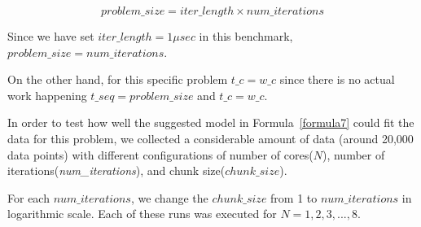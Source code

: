 \begin{equation}\label{problem_size}
problem\_size = iter\_length\times{num\_iterations}
\end{equation}

Since we have set $iter\_{length}=1\mu{sec}$ in this benchmark, $problem\_size = num\_iterations$.
  
On the other hand, for this specific problem $t\_c=w\_c$ since there is no actual work happening  $t\_{seq}=problem\_{size}$ and $t\_c=w\_c$.
 
In order to test how well the suggested model in Formula~\ref{formula7} could fit the data for this problem, we collected a considerable amount of data (around 20,000 data points) with different configurations of number of cores($N$), number of iterations(\emph{num\_{iterations}}), and chunk size($chunk\_{size}$).  

For each $num\_{iterations}$, we change the $chunk\_{size}$ from 1 to $num\_{iterations}$ in logarithmic scale. Each of these runs was executed for $N=1,2,3,...,8$.  

